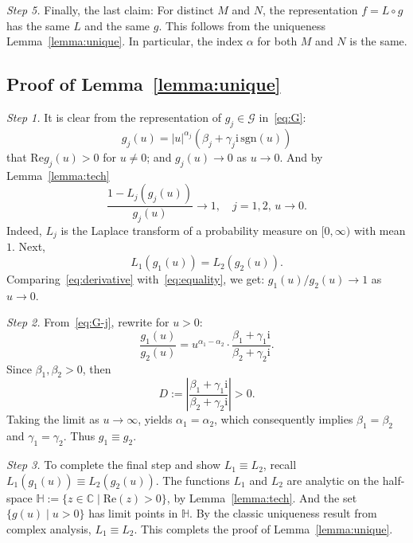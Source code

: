 \documentclass[12pt]{amsart}
\theoremstyle{remark}
\theoremstyle{definition}
\begin{document}
{\it Step 5.} Finally, the last claim: For distinct $M$ and $N$, the representation $f = L\circ g$ has the same $L$ and the same $g$. This follows from the uniqueness Lemma~\ref{lemma:unique}. In particular, the index $\alpha$ for both $M$ and $N$ is the same. 

\subsection{Proof of Lemma~\ref{lemma:unique}} {\it Step 1.} It is clear from the representation of $g_j \in \mathcal G$ in~\eqref{eq:G}:
\begin{equation}
\label{eq:G-j}
g_j(u) = |u|^{\alpha_j}(\beta_j + \gamma_j\mathrm{i}\,\mathrm{sgn}(u))
\end{equation}
that  $\mathrm{Re}g_j(u) > 0$ for $u \ne 0$; and $g_j(u) \to 0$ as $u \to 0$. And by Lemma~\ref{lemma:tech} 
\begin{equation}
\label{eq:derivative}
\frac{1 - L_j(g_j(u))}{g_j(u)} \to 1,\quad j = 1, 2,\, u \to 0.
\end{equation}
Indeed, $L_j$ is the Laplace transform of a probability measure on $[0, \infty)$ with mean $1$. Next, 
\begin{equation}
\label{eq:equality}
L_1(g_1(u)) = L_2(g_2(u)).
\end{equation}
Comparing~\eqref{eq:derivative} with~\eqref{eq:equality}, we get: $g_1(u)/g_2(u) \to 1$ as $u \to 0$.  

{\it Step 2.} From~\eqref{eq:G-j}, rewrite for $u > 0$:
\begin{equation}
\label{eq:ratio}
\frac{g_1(u)}{g_2(u)} = u^{\alpha_1 - \alpha_2}\cdot\frac{\beta_1 + \gamma_1\mathrm{i}}{\beta_2 + \gamma_2\mathrm{i}}.
\end{equation}
Since $\beta_1, \beta_2 > 0$, then 
$$
D := \left|\frac{\beta_1 + \gamma_1\mathrm{i}}{\beta_2 + \gamma_2\mathrm{i}}\right| > 0.
$$
Taking the limit as $u \to \infty$, yields $\alpha_1 = \alpha_2$, which consequently implies $\beta_1 = \beta_2$ and $\gamma_1 = \gamma_2$. Thus $g_1 \equiv g_2$. 

{\it Step 3.} To complete the final step and show $L_1 \equiv L_2$, recall $L_1(g_1(u)) \equiv L_2(g_2(u))$. The functions $L_1$ and $L_2$ are analytic on the half-space $\mathbb H := \{z \in \mathbb C\mid \mathrm{Re}(z) > 0\}$, by Lemma~\ref{lemma:tech}. And the set $\{g(u)\mid u > 0\}$ has limit points in $\mathbb H$. By the classic uniqueness result from complex analysis, $L_1 \equiv L_2$. This complets the proof of Lemma~\ref{lemma:unique}. 
\end{document}
